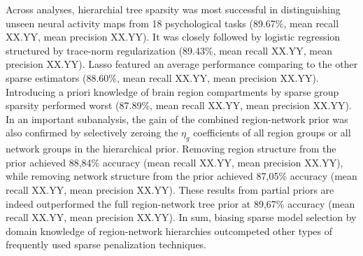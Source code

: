 \documentclass{article}
\begin{document}
Across analyses,
hierarchial tree sparsity was most successful
in distinguishing unseen neural activity maps from 18 psychological tasks
(89.67\%, mean recall XX.YY, mean precision XX.YY).
It was closely followed by logistic regression
structured by trace-norm regularization
(89.43\%, mean recall XX.YY, mean precision XX.YY).
Lasso featured an average performance comparing to the other sparse estimators
(88.60\%, mean recall XX.YY, mean precision XX.YY).
Introducing a priori knowledge of brain region compartments
by sparse group sparsity performed worst
(87.89\%, mean recall XX.YY, mean precision XX.YY).
%
In an important subanalysis,
the gain of the combined region-network prior was also confirmed by
selectively zeroing the $\eta_g$ coefficients of all region groups
or all network groups in the hierarchical prior.
Removing region structure from the prior achieved
88,84\% accuracy (mean recall XX.YY, mean precision XX.YY),
while removing network structure from the prior achieved
87,05\% accuracy (mean recall XX.YY, mean precision XX.YY).
These results from partial priors are indeed outperformed
the full region-network tree prior at 89,67\% accuracy
(mean recall XX.YY, mean precision XX.YY).
%
In sum,
biasing sparse model selection by domain knowledge of region-network hierarchies
outcompeted other types of frequently used sparse penalization techniques.
\end{document}
